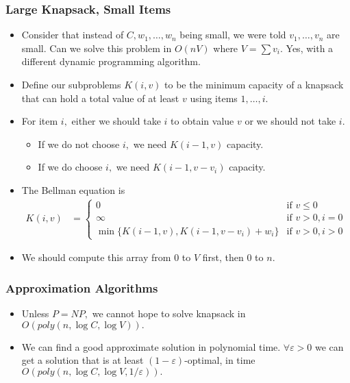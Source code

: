 \documentclass[a4paper,12pt]{article}
\begin{document}
\subsubsection{Large Knapsack, Small Items}
\begin{itemize}
    \item Consider that instead of $C,w_1,\dots,w_n$ being small, we were told $v_1,\dots,v_n$ are small. Can we solve this problem in $O(nV)$ where $V=\sum v_i.$ Yes, with a different dynamic programming algorithm.
    \item Define our subproblems $K(i,v)$ to be the minimum capacity of a knapsack that can hold a total value of at least $v$ using items $1,\dots,i.$
    \item For item $i,$ either we should take $i$ to obtain value $v$ or we should not take $i.$
    \begin{itemize}
        \item If we do not choose $i,$ we need $K(i-1,v)$ capacity.
        \item If we do choose $i,$ we need $K(i-1,v-v_i)$ capacity.
    \end{itemize}
    \item The Bellman equation is \begin{align}
        K(i,v)&=\begin{cases}
            0&\text{if $v\leq0$}\\
            \infty&\text{if $v>0,i=0$}\\
            \min\{K(i-1,v),K(i-1,v-v_i)+w_i\}&\text{if $v>0,i>0$}
        \end{cases}
    \end{align}
    \item We should compute this array from $0$ to $V$ first, then $0$ to $n.$
\end{itemize}
\subsubsection{Approximation Algorithms}
\begin{itemize}
    \item Unless $P=NP,$ we cannot hope to solve knapsack in $O(poly(n,\log C,\log V)).$
    \item We can find a good approximate solution in polynomial time. $\forall\varepsilon>0$ we can get a solution that is at least $(1-\varepsilon)$-optimal, in time $O(poly(n,\log C,\log V,1/\varepsilon)).$
\end{itemize}
\end{document}
